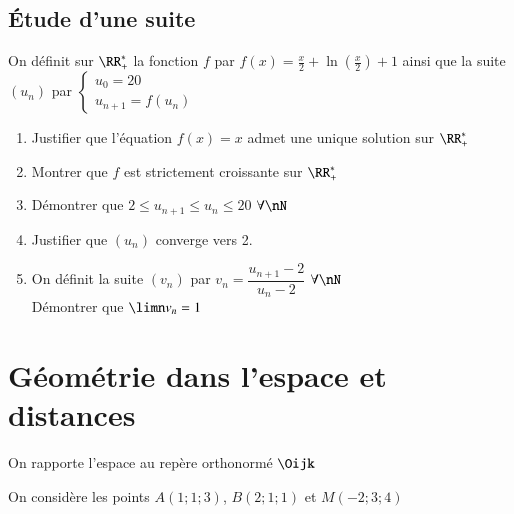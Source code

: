 \documentclass[oneside,12pt]{article}
\let\oldsection\section
\renewcommand{\section}{\newpage\oldsection}
\begin{document}
\subsection{Étude d'une suite}
On définit sur $\RR_+^*$ la fonction $f$ par $f(x)=\frac{x}{2}+\ln\left(\frac{x}{2}\right)+1$ ainsi que la suite $(u_n)$ par $\begin{cases}u_0=20 \\ u_{n+1}=f(u_n)\end{cases}$
\begin{enumerate}
    \item Justifier que l'équation $f(x)=x$ admet une unique solution sur $\RR_+^*$
    \item Montrer que $f$ est strictement croissante sur $\RR_+^*$
    \item Démontrer que $2\leq u_{n+1}\leq u_n\leq20$ \quad $\forall\nN$
    \item Justifier que $(u_n)$ converge vers 2.
    \item On définit la suite $(v_n)$ par $v_n=\dfrac{u_{n+1}-2}{u_n-2}$ \quad $\forall\nN$ \\
        Démontrer que $\limn v_n=1$

\end{enumerate}






\section{Géométrie dans l'espace et distances}
On rapporte l'espace au repère orthonormé $\Oijk$

On considère les points $A(1;1;3)$, $B(2;1;1)$ et $M(-2;3;4)$
\end{document}
